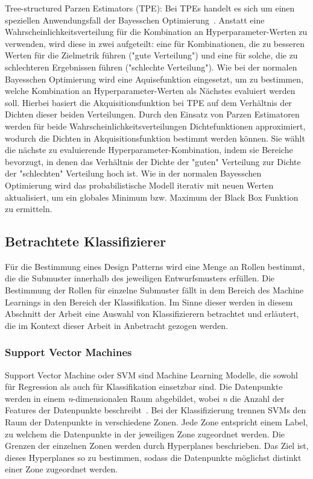 \begin{description}
    \item Tree-structured Parzen Estimators (TPE): Bei TPEs handelt es sich um einen speziellen Anwendungsfall der Bayesschen Optimierung~\cite[S. 4 - 5]{bergstra2011algorithms}. Anstatt eine Wahrscheinlichkeitsverteilung für die Kombination an Hyperparameter-Werten zu verwenden, wird diese in zwei aufgeteilt:
    eine für Kombinationen, die zu besseren Werten für die Zielmetrik führen ("gute Verteilung") und eine für solche, die zu schlechteren Ergebnissen führen ("schlechte Verteilung"). Wie bei der normalen Bayesschen Optimierung wird eine Aquisefunktion eingesetzt, um zu bestimmen, welche Kombination an Hyperparameter-Werten als Nächstes evaluiert werden soll.
    Hierbei basiert die Akquisitionsfunktion bei TPE auf dem Verhältnis der Dichten dieser beiden Verteilungen. Durch den Einsatz von Parzen Estimatoren werden für beide Wahrscheinlichkeitsverteilungen Dichtefunktionen approximiert, wodurch die Dichten in Akquisitionsfunktion bestimmt werden können.
    Sie wählt die nächste zu evaluierende Hyperparameter-Kombination, indem sie Bereiche bevorzugt, in denen das Verhältnis der Dichte der "guten" Verteilung zur Dichte der "schlechten" Verteilung hoch ist.
    Wie in der normalen Bayesschen Optimierung wird das probabilistische Modell iterativ mit neuen Werten aktualisiert, um ein globales Minimum bzw. Maximum der Black Box Funktion zu ermitteln.

\end{description}

\pagebreak

\subsection{Betrachtete Klassifizierer} \label{classifiers}
Für die Bestimmung eines Design Patterns wird eine Menge an Rollen bestimmt, die die Submuster innerhalb des jeweiligen Entwurfsmusters erfüllen.
Die Bestimmung der Rollen für einzelne Submuster fällt in dem Bereich des Machine Learnings in den Bereich der Klassifikation. Im Sinne dieser werden in diesem Abschnitt der Arbeit eine Auswahl von Klassifizierern betrachtet und erläutert, die im Kontext dieser Arbeit in Anbetracht gezogen werden.

\subsubsection*{Support Vector Machines}

Support Vector Machine oder SVM sind Machine Learning Modelle, die sowohl für Regression als auch für Klassifikation einsetzbar sind. Die Datenpunkte werden in einem \textit{n}-dimensionalen Raum abgebildet, wobei \textit{n} die Anzahl der Features der Datenpunkte beschreibt~\cite[S. 435]{10.5555/3133359}.
Bei der Klassifizierung trennen SVMs den Raum der Datenpunkte in verschiedene Zonen. Jede Zone entspricht einem Label, zu welchem die Datenpunkte in der jeweiligen Zone zugeordnet werden. Die Grenzen der einzelnen Zonen werden durch Hyperplanes beschrieben. Das Ziel ist, dieses Hyperplanes so zu bestimmen,
sodass die Datenpunkte möglichst distinkt einer Zone zugeordnet werden.

